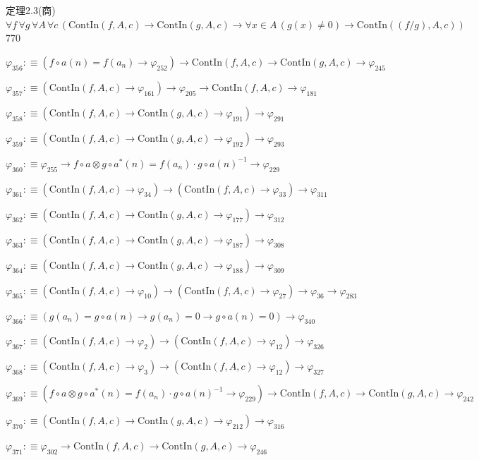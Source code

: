 \begin{fullproof}{定理2.3(商)}{$\forall f\,\forall g\,\forall A\,\forall c\,(\mathrm{ContIn}(f,A,c) \to \mathrm{ContIn}(g,A,c) \to \forall x \in A\,(g(x) \neq 0) \to \mathrm{ContIn}((f / g),A,c))$}{770}
\begin{abbrevlist}
\item $\varphi_{356} :\equiv (f \circ a(n) = f(a_{n}) \to \varphi_{252}) \to \mathrm{ContIn}(f,A,c) \to \mathrm{ContIn}(g,A,c) \to \varphi_{245}$
\item $\varphi_{357} :\equiv (\mathrm{ContIn}(f,A,c) \to \varphi_{161}) \to \varphi_{205} \to \mathrm{ContIn}(f,A,c) \to \varphi_{181}$
\item $\varphi_{358} :\equiv (\mathrm{ContIn}(f,A,c) \to \mathrm{ContIn}(g,A,c) \to \varphi_{191}) \to \varphi_{291}$
\item $\varphi_{359} :\equiv (\mathrm{ContIn}(f,A,c) \to \mathrm{ContIn}(g,A,c) \to \varphi_{192}) \to \varphi_{293}$
\item $\varphi_{360} :\equiv \varphi_{255} \to f \circ a \otimes g \circ a^{\ast}(n) = f(a_{n}) \cdot g \circ a(n)^{-1} \to \varphi_{229}$
\item $\varphi_{361} :\equiv (\mathrm{ContIn}(f,A,c) \to \varphi_{34}) \to (\mathrm{ContIn}(f,A,c) \to \varphi_{33}) \to \varphi_{311}$
\item $\varphi_{362} :\equiv (\mathrm{ContIn}(f,A,c) \to \mathrm{ContIn}(g,A,c) \to \varphi_{177}) \to \varphi_{312}$
\item $\varphi_{363} :\equiv (\mathrm{ContIn}(f,A,c) \to \mathrm{ContIn}(g,A,c) \to \varphi_{187}) \to \varphi_{308}$
\item $\varphi_{364} :\equiv (\mathrm{ContIn}(f,A,c) \to \mathrm{ContIn}(g,A,c) \to \varphi_{188}) \to \varphi_{309}$
\item $\varphi_{365} :\equiv (\mathrm{ContIn}(f,A,c) \to \varphi_{10}) \to (\mathrm{ContIn}(f,A,c) \to \varphi_{27}) \to \varphi_{36} \to \varphi_{283}$
\item $\varphi_{366} :\equiv (g(a_{n}) = g \circ a(n) \to g(a_{n}) = 0 \to g \circ a(n) = 0) \to \varphi_{340}$
\item $\varphi_{367} :\equiv (\mathrm{ContIn}(f,A,c) \to \varphi_{2}) \to (\mathrm{ContIn}(f,A,c) \to \varphi_{12}) \to \varphi_{326}$
\item $\varphi_{368} :\equiv (\mathrm{ContIn}(f,A,c) \to \varphi_{3}) \to (\mathrm{ContIn}(f,A,c) \to \varphi_{12}) \to \varphi_{327}$
\item $\varphi_{369} :\equiv (f \circ a \otimes g \circ a^{\ast}(n) = f(a_{n}) \cdot g \circ a(n)^{-1} \to \varphi_{229}) \to \mathrm{ContIn}(f,A,c) \to \mathrm{ContIn}(g,A,c) \to \varphi_{242}$
\item $\varphi_{370} :\equiv (\mathrm{ContIn}(f,A,c) \to \mathrm{ContIn}(g,A,c) \to \varphi_{212}) \to \varphi_{316}$
\item $\varphi_{371} :\equiv \varphi_{302} \to \mathrm{ContIn}(f,A,c) \to \mathrm{ContIn}(g,A,c) \to \varphi_{246}$

\end{abbrevlist}
\end{fullproof}
